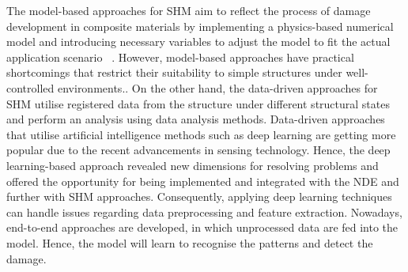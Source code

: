The model-based approaches for SHM aim to reflect the process of damage development in composite materials by implementing a physics-based numerical model and introducing necessary variables to adjust the model to fit the actual application scenario ~\cite{Wu2021}. 
However, model-based approaches have practical shortcomings that restrict their suitability to simple structures under well-controlled environments..
%
%
On the other hand, the data-driven approaches for SHM utilise registered data from the structure under different structural states and perform an analysis using data analysis methods.
Data-driven approaches that utilise artificial intelligence methods such as deep learning are getting more popular due to the recent advancements in sensing technology.
Hence, the deep learning-based approach revealed new dimensions for resolving problems and offered the opportunity for being implemented and integrated with the NDE and further with SHM approaches. 
Consequently, applying deep learning techniques can handle issues regarding data preprocessing and feature extraction.
Nowadays, end-to-end approaches are developed, in which unprocessed data are fed into the model.
Hence, the model will learn to recognise the patterns and detect the damage.
%

